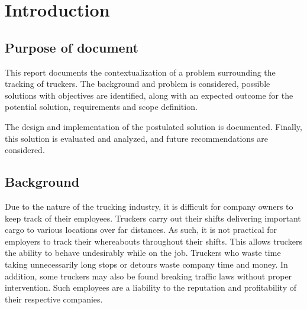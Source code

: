 \section{Introduction}
\subsection{Purpose of document}
This report documents the contextualization of a problem surrounding the tracking of truckers.
The background and problem is considered, possible solutions with objectives are identified, along with an expected outcome for the potential solution, requirements and scope definition.

The design and implementation of the postulated solution is documented.
Finally, this solution is evaluated and analyzed, and future recommendations are considered.

\subsection{Background}
Due to the nature of the trucking industry, it is difficult for company owners to keep track of their employees.
Truckers carry out their shifts delivering important cargo to various locations over far distances.
As such, it is not practical for employers to track their whereabouts throughout their shifts.
This allows truckers the ability to behave undesirably while on the job.
Truckers who waste time taking unnecessarily long stops or detours waste company time and money.
In addition, some truckers may also be found breaking traffic laws without proper intervention.
Such employees are a liability to the reputation and profitability of their respective companies.

